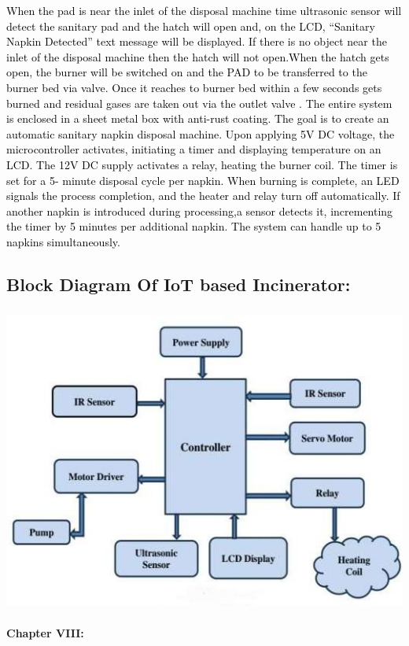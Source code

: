 \documentclass[letterpaper]{article}
\begin{document}
\textcolor{black}{When the pad is near the inlet of the disposal machine time ultrasonic sensor will detect the sanitary
pad and the hatch will open and, on the LCD, ``Sanitary Napkin Detected'' text message will be displayed. If there is
no object near the inlet of the disposal machine then the hatch will not open.When the hatch gets open, the burner will
be switched on and the PAD to be transferred to the burner bed via valve. Once it reaches to burner bed within a few
seconds gets burned and residual gases are taken out via the outlet valve . The entire system is enclosed in a sheet
metal box with anti-rust coating. The goal is to create an automatic sanitary napkin disposal machine. Upon applying 5V
DC voltage, the microcontroller activates, initiating a timer and displaying temperature on an LCD. The 12V DC supply
activates a relay, heating the burner coil. The timer is set for a 5- minute disposal cycle per napkin. When burning is
complete, an LED signals the process completion, and the heater and relay turn off automatically. If another napkin is
introduced during processing,a sensor detects it, incrementing the timer by 5 minutes per additional napkin. The system
can handle up to 5 napkins simultaneously.}


\bigskip

\subsection{Block Diagram Of IoT based Incinerator:}


\begin{center}
\includegraphics[width=5.4429in,height=3.9898in]{DocumentfromPrachiTorave-img001.jpg}
\end{center}
\clearpage\setcounter{page}{1}\pagestyle{Convertedxix}
{\textbf{Chapter VIII:}
\par}
\end{document}
